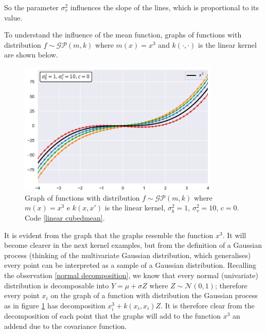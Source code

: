 So the parameter $\sigma_v^2$ influences the slope of the lines, which is proportional to its value.

To understand the influence of the mean function, graphs of functions with distribution $f\sim \mathcal{GP}(m,k)$ where $m(x)=x^3$ and $k(\cdot,\cdot)$ is the linear kernel are shown below.


\begin{figure}[h]
    \centering
    \includegraphics[width=0.85\textwidth]{images/Gaussian process/Linear - cubedmean.pdf}
    \caption{Graph of functions with distribution $f\sim \mathcal{GP}(m,k)$ where $m(x)=x^3$ e $k(x,x')$ is the linear kernel, $\sigma_b^2=1$, $\sigma_v^2=10$, $c=0$. Code \ref{linear cubedmean}.}
    \label{10 sample linear kernel cubed mean}
\end{figure}


\newpage

It is evident from the graph that the graphs resemble the function $x^3$. It will become clearer in the next kernel examples, but from the definition of a Gaussian process (thinking of the multivariate Gaussian distribution, which generalises) every point can be interpreted as a sample of a Gaussian distribution. Recalling the observation \ref{normal decomposition}, we know that every normal (univariate) distribution is decomposable into $Y=\mu+\sigma Z$ where $Z\sim \mathcal{N}(0,1)$; therefore every point $x_i$ on the graph of a function with distribution the Gaussian process as in figure \ref{10 sample linear kernel cubed mean} has decomposition $x_i^3+k(x_i,x_i)Z$. It is therefore clear from the decomposition of each point that the graphs will add to the function $x^3$ an addend due to the covariance function.





